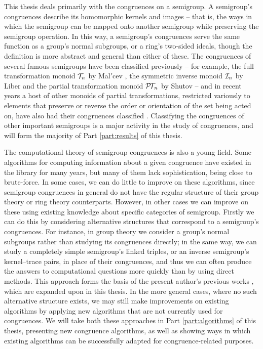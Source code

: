 This thesis deals primarily with the congruences on a semigroup.  A semigroup's
congruences describe its homomorphic kernels and images -- that is, the ways in
which the semigroup can be mapped onto another semigroup while preserving the
semigroup operation.  In this way, a semigroup's congruences serve the same
function as a group's normal subgroups, or a ring's two-sided ideals, though the
definition is more abstract and general than either of these.  The congruences
of several famous semigroups have been classified previously -- for example, the
full transformation monoid $\mathcal{T}_n$ by Mal$'$cev \cite{malcev_1952}, the symmetric
inverse monoid $\mathcal{I}_n$ by Liber \cite{liber_1953} and the partial transformation
monoid $\mathcal{P\!T\!}_n$ by Shutov \cite{shutov_1988} -- and in recent years a host of
other monoids of partial transformations, restricted variously to elements that
preserve or reverse the order or orientation of the set being acted on, have
also had their congruences classified \cite{fernandes_2000, lisbon_ii,
  lisbon_i}.  Classifying the congruences of other important semigroups is a
major activity in the study of congruences, and will form the majority of Part
\ref{part:results} of this thesis.

The computational theory of semigroup congruences is also a young field.  Some
algorithms for computing information about a given congruence have existed in
the \GAP{} library for many years, but many of them lack sophistication, being
close to brute-force.  In some cases, we can do little to improve on these
algorithms, since semigroup congruences in general do not have the regular
structure of their group theory or ring theory counterparts.  However, in other
cases we can improve on these using existing knowledge about specific categories
of semigroup.  Firstly we can do this by considering alternative structures that
correspond to a semigroup's congruences.  For instance, in group theory we
consider a group's normal subgroups rather than studying its congruences
directly; in the same way, we can study a completely simple semigroup's linked
triples, or an inverse semigroup's kernel--trace pairs, in place of their
congruences, and thus we can often produce the answers to computational
questions more quickly than by using direct methods.  This approach forms the
basis of the present author's previous works \cite{mtorpey_pre_msc,
  mtorpey_msc}, which are expanded upon in this thesis. In the more general
cases, where no such alternative structure exists, we may still make
improvements on existing algorithms by applying new algorithms that are not
currently used for congruences.  We will take both these approaches in Part
\ref{part:algorithms} of this thesis, presenting new congruence algorithms, as
well as showing ways in which existing algorithms can be successfully adapted
for congruence-related purposes.

